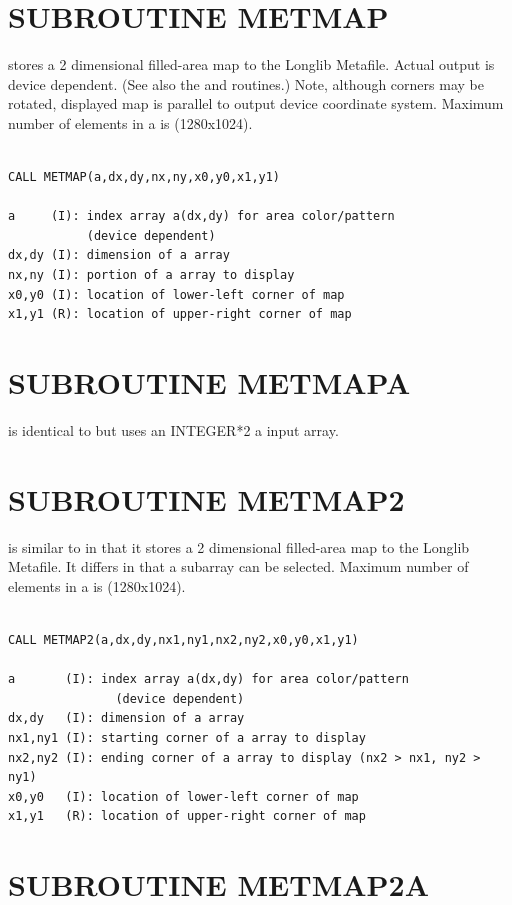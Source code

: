\documentclass[11pt]{report}
\begin{document}
\section{SUBROUTINE METMAP}

 stores a 2 dimensional filled-area map to the Longlib Metafile. 
Actual output is device dependent.  (See also the  and  routines.)
Note, although corners may be rotated, displayed map is parallel to
output device coordinate system.  Maximum number of elements in a is
(1280x1024).
\begin{verbatim}

CALL METMAP(a,dx,dy,nx,ny,x0,y0,x1,y1)

a     (I): index array a(dx,dy) for area color/pattern 
           (device dependent)
dx,dy (I): dimension of a array
nx,ny (I): portion of a array to display
x0,y0 (I): location of lower-left corner of map
x1,y1 (R): location of upper-right corner of map
\end{verbatim}

\section{SUBROUTINE METMAPA}

 is identical to  but uses an INTEGER*2 a input
array.

\section{SUBROUTINE METMAP2}

 is similar to  in that it stores a 2 dimensional
filled-area map to the Longlib Metafile.  It differs in that a subarray
can be selected.  Maximum number of elements in a is (1280x1024).
\begin{verbatim}

CALL METMAP2(a,dx,dy,nx1,ny1,nx2,ny2,x0,y0,x1,y1)

a       (I): index array a(dx,dy) for area color/pattern 
               (device dependent)
dx,dy   (I): dimension of a array
nx1,ny1 (I): starting corner of a array to display
nx2,ny2 (I): ending corner of a array to display (nx2 > nx1, ny2 > ny1)
x0,y0   (I): location of lower-left corner of map
x1,y1   (R): location of upper-right corner of map
\end{verbatim}

\section{SUBROUTINE METMAP2A}
\end{document}
